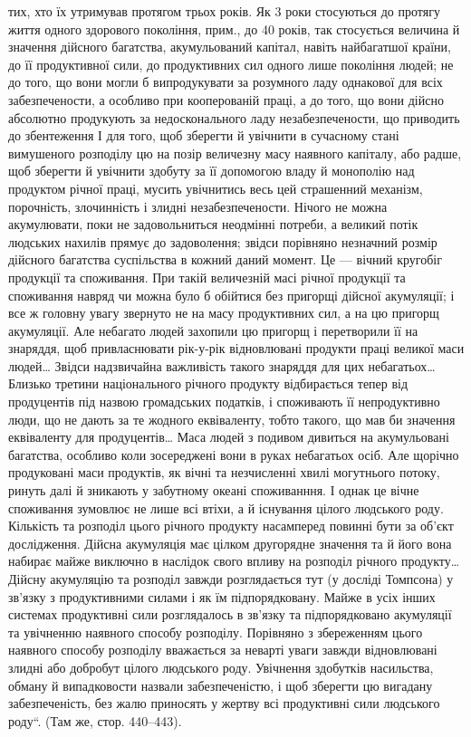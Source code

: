 \parcont{}  %
тих, хто їх утримував протягом трьох років. Як 3 роки стосуються
до протягу життя одного здорового покоління, прим., до 40 років,
так стосується величина й значення дійсного багатства, акумульований
капітал, навіть найбагатшої країни, до її продуктивної сили, до продуктивних
сил одного лише покоління людей; не до того, що вони могли б
випродукувати за розумного ладу однакової для всіх забезпечености, а
особливо при кооперованій праці, а до того, що вони дійсно абсолютно
продукують за недосконального ладу незабезпечености, що приводить до
збентеження І для того, щоб зберегти й увічнити в сучасному стані вимушеного
розподілу цю на позір величезну масу наявного капіталу, або радше,
щоб зберегти й увічнити здобуту за її допомогою владу й монополію
над продуктом річної праці, мусить увічнитись весь цей страшенний
механізм, порочність, злочинність і злидні незабезпечености. Нічого не
можна акумулювати, поки не задовольниться неодмінні потреби, а великий
потік людських нахилів прямує до задоволення; звідси порівняно незначний
розмір дійсного багатства суспільства в кожний даний момент.
Це — вічний кругобіг продукції та споживання. При такій величезній масі
річної продукції та споживання навряд чи можна було б обійтися без
пригорщі дійсної акумуляції; і все ж головну увагу звернуто не на
масу продуктивних сил, а на цю пригорщ акумуляції. Але небагато
людей захопили цю пригорщ і перетворили її на знаряддя, щоб
привласнювати рік-у-рік відновлювані продукти праці великої маси людей\dots{}
Звідси надзвичайна важливість такого знаряддя для цих небагатьох\dots{}
Близько третини національного річного продукту відбирається тепер від
продуцентів під назвою громадських податків, і споживають її непродуктивно
люди, що не дають за те жодного еквіваленту, тобто такого, що
мав би значення еквіваленту для продуцентів\dots{} Маса людей з подивом
дивиться на акумульовані багатства, особливо коли зосереджені вони в
руках небагатьох осіб. Але щорічно продуковані маси продуктів, як
вічні та незчисленні хвилі могутнього потоку, ринуть далі й зникають у
забутному океані споживанння. І однак це вічне споживання зумовлює
не лише всі втіхи, а й існування цілого людського роду. Кількість та
розподіл цього річного продукту насамперед повинні бути за об’єкт дослідження.
Дійсна акумуляція має цілком другорядне значення та й його
вона набирає майже виключно в наслідок свого впливу на розподіл річного
продукту\dots{} Дійсну акумуляцію та розподіл завжди розглядається тут
(у досліді Томпсона) у зв'язку з продуктивними силами і як їм підпорядковану.
Майже в усіх інших системах продуктивні сили розглядалось
в зв’язку та підпорядковано акумуляції та увічненню наявного
способу розподілу. Порівняно з збереженням цього наявного способу
розподілу вважається за неварті уваги завжди відновлювані злидні або
добробут цілого людського роду. Увічнення здобутків насильства, обману
й випадковости назвали забезпеченістю, і щоб зберегти цю вигадану
забезпеченість, без жалю приносять у жертву всі продуктивні сили
людського роду“. (Там же, стор. 440--443).
